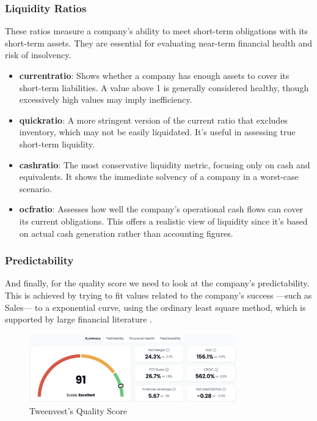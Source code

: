 \documentclass[11pt,english,a4paper,hidelinks]{book}
\begin{document}
\subsubsection{Liquidity Ratios}
These ratios measure a company's ability to meet short-term obligations with its short-term assets. They are essential for evaluating near-term financial health and risk of insolvency.

\begin{itemize}
    \item \textbf{\acrshort{currentratio}}: Shows whether a company has enough assets to cover its short-term liabilities. A value above 1 is generally considered healthy, though excessively high values may imply inefficiency.
    
    \item \textbf{\acrshort{quickratio}}: A more stringent version of the current ratio that excludes inventory, which may not be easily liquidated. It's useful in assessing true short-term liquidity.
    
    \item \textbf{\acrshort{cashratio}}: The most conservative liquidity metric, focusing only on cash and equivalents. It shows the immediate solvency of a company in a worst-case scenario.
    
    \item \textbf{\acrshort{ocfratio}}: Assesses how well the company's operational cash flows can cover its current obligations. This offers a realistic view of liquidity since it's based on actual cash generation rather than accounting figures.
\end{itemize}

\subsubsection{Predictability}

\noindent And finally, for the quality score we need to look at the company's predictability. This is achieved by trying to fit values related to the company's success —such as Sales— to a exponential curve, using the ordinary least square method, which is supported by large financial literature \cite{msci2024fundamental}.


\begin{figure}[H]
    \centering
    \includegraphics[width=0.8\textwidth]{images/tweenvest/quality score.png}
    \caption{Tweenvest's Quality Score}
    \label{fig:quality_score}
\end{figure}
\end{document}
